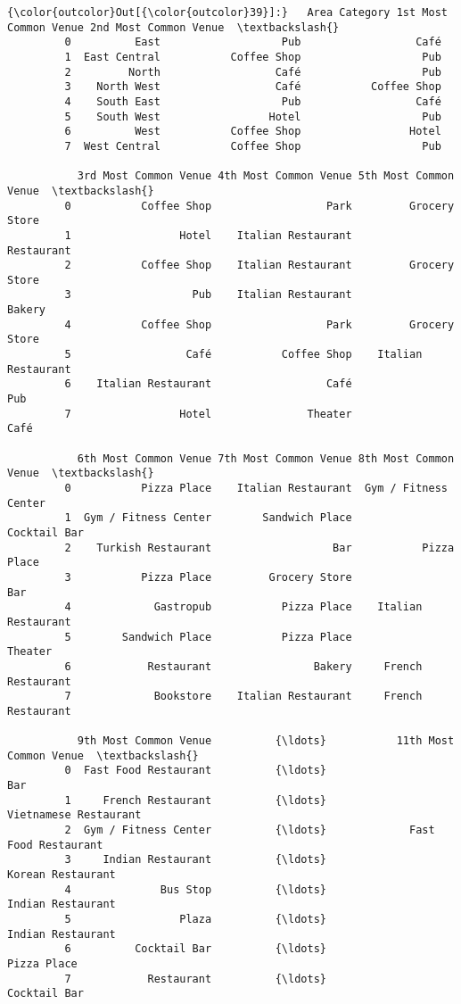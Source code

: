 \documentclass[11pt]{article}
\begin{document}
\begin{Verbatim}[commandchars=\\\{\}]
{\color{outcolor}Out[{\color{outcolor}39}]:}   Area Category 1st Most Common Venue 2nd Most Common Venue  \textbackslash{}
         0          East                   Pub                  Café   
         1  East Central           Coffee Shop                   Pub   
         2         North                  Café                   Pub   
         3    North West                  Café           Coffee Shop   
         4    South East                   Pub                  Café   
         5    South West                 Hotel                   Pub   
         6          West           Coffee Shop                 Hotel   
         7  West Central           Coffee Shop                   Pub   
         
           3rd Most Common Venue 4th Most Common Venue 5th Most Common Venue  \textbackslash{}
         0           Coffee Shop                  Park         Grocery Store   
         1                 Hotel    Italian Restaurant            Restaurant   
         2           Coffee Shop    Italian Restaurant         Grocery Store   
         3                   Pub    Italian Restaurant                Bakery   
         4           Coffee Shop                  Park         Grocery Store   
         5                  Café           Coffee Shop    Italian Restaurant   
         6    Italian Restaurant                  Café                   Pub   
         7                 Hotel               Theater                  Café   
         
           6th Most Common Venue 7th Most Common Venue 8th Most Common Venue  \textbackslash{}
         0           Pizza Place    Italian Restaurant  Gym / Fitness Center   
         1  Gym / Fitness Center        Sandwich Place          Cocktail Bar   
         2    Turkish Restaurant                   Bar           Pizza Place   
         3           Pizza Place         Grocery Store                   Bar   
         4             Gastropub           Pizza Place    Italian Restaurant   
         5        Sandwich Place           Pizza Place               Theater   
         6            Restaurant                Bakery     French Restaurant   
         7             Bookstore    Italian Restaurant     French Restaurant   
         
           9th Most Common Venue          {\ldots}           11th Most Common Venue  \textbackslash{}
         0  Fast Food Restaurant          {\ldots}                              Bar   
         1     French Restaurant          {\ldots}            Vietnamese Restaurant   
         2  Gym / Fitness Center          {\ldots}             Fast Food Restaurant   
         3     Indian Restaurant          {\ldots}                Korean Restaurant   
         4              Bus Stop          {\ldots}                Indian Restaurant   
         5                 Plaza          {\ldots}                Indian Restaurant   
         6          Cocktail Bar          {\ldots}                      Pizza Place   
         7            Restaurant          {\ldots}                     Cocktail Bar   
         

\end{Verbatim}
\end{document}
